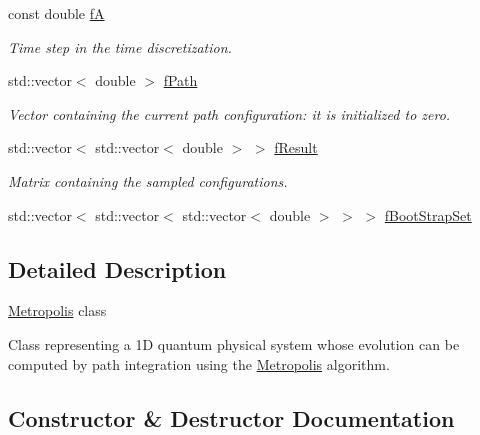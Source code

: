 \begin{DoxyCompactItemize}
\mbox{\label{classMetropolis_ad9ff6ca323cf287905aaf3c5e7f25cad}} 
const double \hyperlink{classMetropolis_ad9ff6ca323cf287905aaf3c5e7f25cad}{fA}
\begin{DoxyCompactList}\small\item\em Time step in the time discretization. \end{DoxyCompactList}\item 
\mbox{\label{classMetropolis_aaed710e91d19ab1a0356c864d105efbe}} 
std\+::vector$<$ double $>$ \hyperlink{classMetropolis_aaed710e91d19ab1a0356c864d105efbe}{f\+Path}
\begin{DoxyCompactList}\small\item\em Vector containing the current path configuration\+: it is initialized to zero. \end{DoxyCompactList}\item 
\mbox{\label{classMetropolis_aaf8912c959d11c683d7222fbb0e0ec39}} 
std\+::vector$<$ std\+::vector$<$ double $>$ $>$ \hyperlink{classMetropolis_aaf8912c959d11c683d7222fbb0e0ec39}{f\+Result}
\begin{DoxyCompactList}\small\item\em Matrix containing the sampled configurations. \end{DoxyCompactList}\item 
std\+::vector$<$ std\+::vector$<$ std\+::vector$<$ double $>$ $>$ $>$ \hyperlink{classMetropolis_ae7950341ed835f9ec689b46b2a913bed}{f\+Boot\+Strap\+Set}
\end{DoxyCompactItemize}


\subsection{Detailed Description}
\hyperlink{classMetropolis}{Metropolis} class

Class representing a 1D quantum physical system whose evolution can be computed by path integration using the \hyperlink{classMetropolis}{Metropolis} algorithm. 

\subsection{Constructor \& Destructor Documentation}
\mbox{\label{classMetropolis_ac702bd026368a444886580d372a99018}} 
